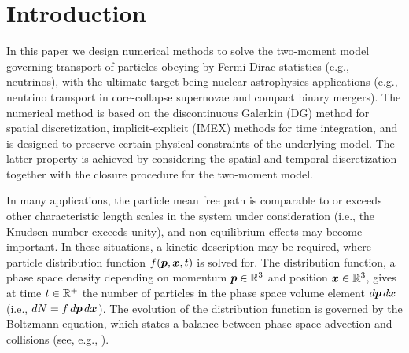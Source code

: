 \section{Introduction}
\label{sec:intro}

In this paper we design numerical methods to solve the two-moment model governing transport of particles obeying by Fermi-Dirac statistics (e.g., neutrinos), with the ultimate target being nuclear astrophysics applications (e.g., neutrino transport in core-collapse supernovae and compact binary mergers).  
The numerical method is based on the discontinuous Galerkin (DG) method for spatial discretization, implicit-explicit (IMEX) methods for time integration, and is designed to preserve certain physical constraints of the underlying model.  
The latter property is achieved by considering the spatial and temporal discretization together with the closure procedure for the two-moment model.  

In many applications, the particle mean free path is comparable to or exceeds other characteristic length scales in the system under consideration (i.e., the Knudsen number exceeds unity), and non-equilibrium effects may become important.  
In these situations, a kinetic description may be required, where particle distribution function $f(\boldsymbol{p},\boldsymbol{x},t)$ is solved for.  
The distribution function, a phase space density depending on momentum $\boldsymbol{p}\in\mathbb{R}^{3}$ and position $\boldsymbol{x}\in\mathbb{R}^{3}$, gives at time $t\in\mathbb{R}^{+}$ the number of particles in the phase space volume element $d\boldsymbol{p}\,d\boldsymbol{x}$ (i.e., $dN=f\,d\boldsymbol{p}\,d\boldsymbol{x}$).  
The evolution of the distribution function is governed by the Boltzmann equation, which states a balance between phase space advection and collisions (see, e.g., \cite{braginskii_1965,chapmanCowling_1970,lifshitzPitaevskii_1981}).  

